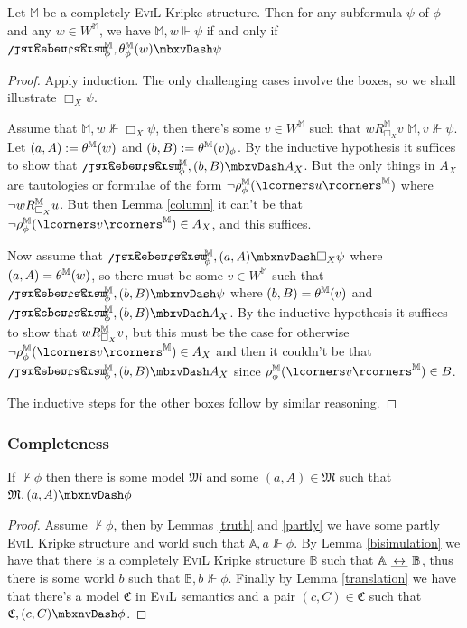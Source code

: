\begin{lemma}\label{translation}
Let $\mathbb{M}$ be a completely \textsc{EviL} Kripke structure.  Then for any subformula $\psi$ of $\phi$ and any $w \in W^\mathbb{M}$, we have $\mathbb{M},w \Vdash \psi$ if and only if $\ipent^\mathbb{M}_\phi, \Kill_\phi^\mathbb{M}(w) \models \psi$

\end{lemma}
\begin{proof}
Apply induction.  The only challenging cases involve the boxes, so we shall illustrate $\Box_X \psi$.  

Assume that $\mathbb{M}, w \nVdash \Box_X \psi$, then there's some $v \in W^\mathbb{M}$ such that $w R^\mathbb{M}_{\Box_X} v$ $\mathbb{M}, v \nVdash \psi$. Let $(a,A) := \theta^\mathbb{M}(w)$ and $(b,B) := \theta^\mathbb{M}(v)_\phi$. By the inductive hypothesis it suffices to show that $\ipent^\mathbb{M}_\phi,(b,B) \models A_X$.  But the only things in  $A_X$ are tautologies or formulae of the form $\neg \rho^\mathbb{M}_\phi(\lcorners u\rcorners^\mathbb{M})$ where $\neg w R^\mathbb{M}_{\Box_X} u$.  But then Lemma \ref{column} it can't be that $\neg \rho^\mathbb{M}_\phi(\lcorners v\rcorners^\mathbb{M}) \in A_X$, and this suffices.

Now assume that $\ipent^\mathbb{M}_\phi, (a,A) \nmodels \Box_X \psi$ where $(a,A) = \theta^\mathbb{M}(w)$, so there must be some $v \in W^\mathbb{M}$ such that $\ipent^\mathbb{M}_\phi, (b,B) \nmodels  \psi$ where $(b,B) = \theta^\mathbb{M}(v)$ and $\ipent^\mathbb{M}_\phi, (b,B) \models  A_X$.  By the inductive hypothesis it suffices to show that $w R^\mathbb{M}_{\Box_X} v$, but this must be the case for otherwise $\neg \rho^\mathbb{M}_\phi(\lcorners v\rcorners^\mathbb{M}) \in A_X$ and then it couldn't be that $\ipent^\mathbb{M}_\phi, (b,B) \models  A_X$ since $\rho^\mathbb{M}_\phi(\lcorners v\rcorners^\mathbb{M}) \in B$.

The inductive steps for the other boxes follow by similar reasoning.
\end{proof}

\subsubsection{Completeness}\label{conservative-extension}

\begin{theorem}
If $\nvdash \phi$ then there is some model $\mathfrak{M}$ and some $(a,A) \in \mathfrak{M}$ such that $\mathfrak{M},(a,A) \nmodels \phi$ 
\end{theorem}
\begin{proof}
	Assume $\nvdash \phi$, then by Lemmas \ref{truth} and \ref{partly} we have some partly \textsc{EviL} Kripke 
	structure and world such that $\mathbb{A},a \nVdash \phi$.  By Lemma \ref{bisimulation} we have that there is a 
	completely \textsc{EviL} Kripke structure $\mathbb{B}$ such that $\mathbb{A}\ \underline{\IFF}{}\ \mathbb{B}$, thus there is some world $b$ such that $\mathbb{B},b \nVdash \phi$.  
	Finally by Lemma \ref{translation} we have that there's a model $\mathfrak{C}$ in \textsc{EviL} semantics and a pair $(c,C) \in \mathfrak{C}$ such that $\mathfrak{C},(c,C) \nmodels \phi$.
\end{proof}

